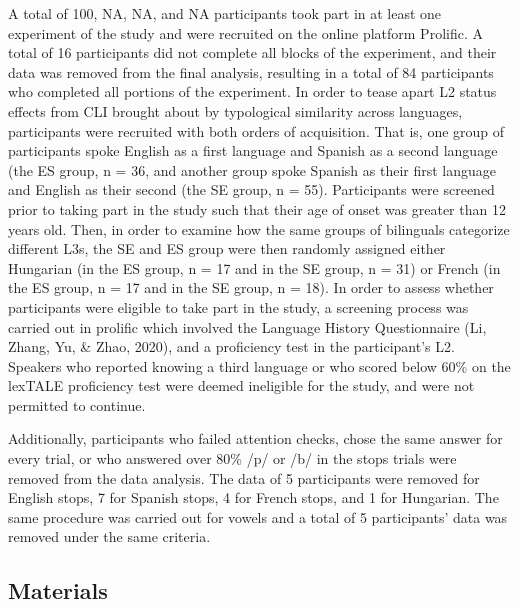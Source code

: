 \documentclass[
  english,
  man]{apa6}
\begin{document}
A total of 100, NA, NA, and NA participants took part in at least one experiment of the study and were recruited on the online platform Prolific. A total of 16 participants did not complete all blocks of the experiment, and their data was removed from the final analysis, resulting in a total of 84 participants who completed all portions of the experiment.
In order to tease apart L2 status effects from CLI brought about by typological similarity across languages, participants were recruited with both orders of acquisition.
That is, one group of participants spoke English as a first language and Spanish as a second language (the ES group, n = 36, and another group spoke Spanish as their first language and English as their second (the SE group, n = 55). Participants were screened prior to taking part in the study such that their age of onset was greater than 12 years old.
Then, in order to examine how the same groups of bilinguals categorize different L3s, the SE and ES group were then randomly assigned either Hungarian (in the ES group, n = 17 and in the SE group, n =
31) or French (in the ES group, n = 17 and in the SE group, n = 18).
In order to assess whether participants were eligible to take part in the study, a screening process was carried out in prolific which involved the Language History Questionnaire (Li, Zhang, Yu, \& Zhao, 2020), and a proficiency test in the participant's L2.
Speakers who reported knowing a third language or who scored below 60\% on the lexTALE proficiency test were deemed ineligible for the study, and were not permitted to continue.

Additionally, participants who failed attention checks, chose the same answer for every trial, or who answered over 80\% /p/ or /b/ in the stops trials were removed from the data analysis.
The data of 5 participants were removed for English stops, 7 for Spanish stops, 4 for French stops, and 1 for Hungarian. The same procedure was carried out for vowels and a total of 5 participants' data was removed under the same criteria.

\hypertarget{materials}{%
\subsection{Materials}\label{materials}}
\end{document}
